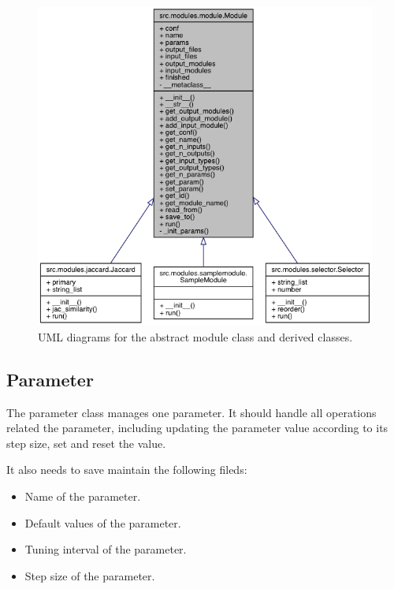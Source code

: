 \documentclass{article}
\begin{document}
    \begin{figure}[H]
        \begin{center}
            \includegraphics[width=\textwidth]{fig/module_uml.png}
        \end{center}
        \label{fig:module_uml}
        \caption{UML diagrams for the abstract module class and derived classes.}
    \end{figure}

    \subsection{Parameter}
    \label{sec:parameter}
    The parameter class manages one parameter.
    It should handle all operations related the parameter,
    including updating the parameter value according to its step size,
    set and reset the value.

    It also needs to save maintain the following fileds:
    \begin{itemize}
        \item Name of the parameter.
        \item Default values of the parameter.
        \item Tuning interval of the parameter.
        \item Step size of the parameter.
    \end{itemize}
\end{document}
